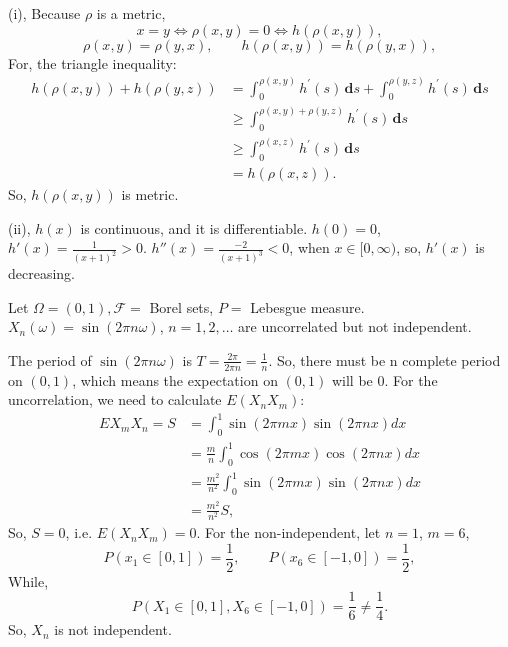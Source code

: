 \documentclass[en, normal, 11pt, black]{elegantnote}
\newenvironment{exercise}[1]{\begin{tcolorbox}[colback=black!15, colframe=black!80, breakable, title=#1]}{\end{tcolorbox}}
\renewenvironment{proof}{\begin{tcolorbox}[colback=white, colframe=black!50, breakable, title=Proof. ]\setlength{\parskip}{0.8em}}{\,\\\rightline{$\square$}\end{tcolorbox}}
\newcommand{\der}{\,\mathbf{d}}
\begin{document}
    \begin{proof}
        (i), Because $\rho$ is a metric, 
        \[
            x=y\Leftrightarrow\rho(x,y)=0\Leftrightarrow h(\rho(x,y)), 
        \]
        \[\rho(x,y)=\rho(y,x),\qquad h(\rho(x,y))=h(\rho(y,x)), \]
        For, the triangle inequality: 
        \[
            \begin{aligned}
            h(\rho(x, y))+h(\rho(y, z)) &=\int_{0}^{\rho(x, y)} h^{\prime}(s) \der s+\int_{0}^{\rho(y, z)} h^{\prime}(s) \der s \\
            & \geq \int_{0}^{\rho(x, y)+\rho(y, z)} h^{\prime}(s) \der s \\
            & \geq \int_{0}^{\rho(x, z)} h^{\prime}(s) \der s\\
            &=h(\rho(x, z)). 
            \end{aligned}
        \]
        So, $h(\rho(x,y))$ is metric. 

        (ii), $h(x)$ is continuous, and it is differentiable. $h(0)=0$, $h'(x)=\frac{1}{(x+1)^2}>0$. $h''(x)=\frac{-2}{(x+1)^3}<0$, when $x\in[0,\infty)$, so, $h'(x)$ is decreasing. 
    \end{proof}

    \begin{exercise}{2.1.4}
        Let $\Omega=(0,1), \mathcal{F}=$ Borel sets, $P=$ Lebesgue measure. $X_{n}(\omega)=\sin (2 \pi n \omega)$, $n=1,2, \ldots$ are uncorrelated but not independent. 
    \end{exercise}

    \begin{proof}
        The period of $\sin(2\pi n\omega)$ is $T=\frac{2\pi}{2\pi n}=\frac{1}{n}$. So, there must be n complete period on $(0, 1)$, which means the expectation on $(0,1)$ will be $0$. For the uncorrelation, we need to calculate $E(X_nX_m)$: 
        \[
            \begin{aligned}
                E X_{m} X_{n}=S &=\int_{0}^{1} \sin (2 \pi m x) \sin (2 \pi n x) d x \\
                &=\frac{m}{n} \int_{0}^{1} \cos (2 \pi m x) \cos (2 \pi n x) d x \\
                &=\frac{m^{2}}{n^{2}} \int_{0}^{1} \sin (2 \pi m x) \sin (2 \pi n x) d x\\
                &=\frac{m^2}{n^2}S, 
            \end{aligned}
        \]
        So, $S=0$, i.e. $E(X_nX_m)=0$. For the non-independent, let $n=1$, $m=6$, 
        \[P(x_1\in[0,1])=\frac{1}{2},\qquad P(x_6\in[-1,0])=\frac{1}{2}, \]
        While, 
        \[P(X_1\in[0,1], X_6\in[-1,0])=\frac{1}{6}\not=\frac{1}{4}. \]
        So, $X_n$ is not independent. 
    \end{proof}
\end{document}
